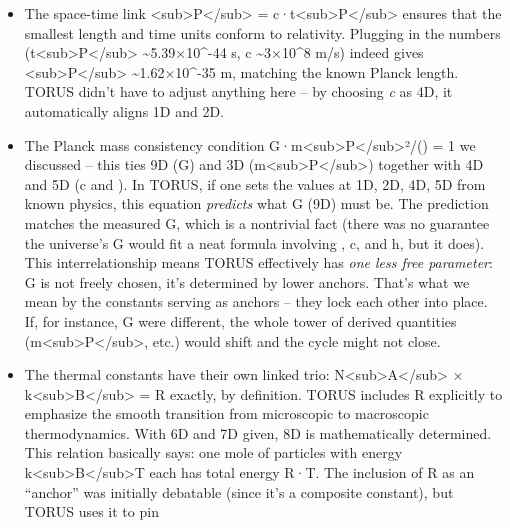 \documentclass[
]{article}
\begin{document}
\begin{itemize}
\item
  The space-time link
  \ell\textless sub\textgreater P\textless/sub\textgreater{} =
  c·t\textless sub\textgreater P\textless/sub\textgreater\hspace{0pt}
  ensures that the smallest length and time units conform to relativity.
  Plugging in the numbers
  (t\textless sub\textgreater P\textless/sub\textgreater{}
  \textasciitilde5.39×10\^{}-44 s, c \textasciitilde3×10\^{}8 m/s)
  indeed gives \ell\textless sub\textgreater P\textless/sub\textgreater{}
  \textasciitilde1.62×10\^{}-35 m, matching the known Planck length.
  TORUS didn't have to adjust anything here -- by choosing \emph{c} as
  4D, it automatically aligns 1D and 2D.
\item
  The Planck mass consistency condition
  G·m\textless sub\textgreater P\textless/sub\textgreater²/(\hbarc) =
  1\hspace{0pt} we discussed -- this ties 9D (G) and 3D
  (m\textless sub\textgreater P\textless/sub\textgreater) together with
  4D and 5D (c and \hbar). In TORUS, if one sets the values at 1D, 2D, 4D,
  5D from known physics, this equation \emph{predicts} what G (9D) must
  be. The prediction matches the measured G, which is a nontrivial fact
  (there was no guarantee the universe's G would fit a neat formula
  involving \alpha, c, and h, but it does). This interrelationship means
  TORUS effectively has \emph{one less free parameter}: G is not freely
  chosen, it's determined by lower anchors\hspace{0pt}. That's what we
  mean by the constants serving as anchors -- they lock each other into
  place. If, for instance, G were different, the whole tower of derived
  quantities (m\textless sub\textgreater P\textless/sub\textgreater,
  etc.) would shift and the cycle might not close.
\item
  The thermal constants have their own linked trio:
  N\textless sub\textgreater A\textless/sub\textgreater{} ×
  k\textless sub\textgreater B\textless/sub\textgreater{} = R exactly,
  by definition. TORUS includes R explicitly to emphasize the smooth
  transition from microscopic to macroscopic thermodynamics\hspace{0pt}.
  With 6D and 7D given, 8D is mathematically determined. This relation
  basically says: one mole of particles with energy
  k\textless sub\textgreater B\textless/sub\textgreater T each has total
  energy R·T. The inclusion of R as an ``anchor'' was initially
  debatable (since it's a composite constant), but TORUS uses it to pin

\end{itemize}
\end{document}
